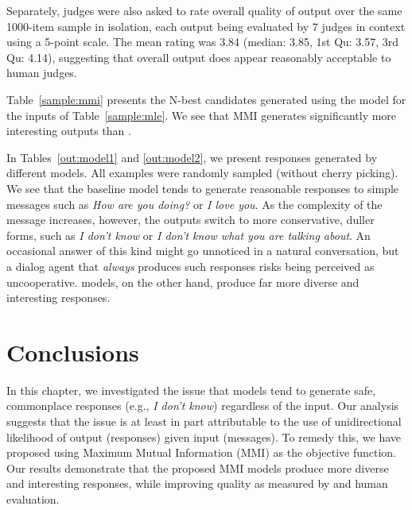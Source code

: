  
Separately, judges were also asked to rate overall quality of \mmiBD output over the same 1000-item sample in isolation, each output being evaluated by 7 judges in context using a 5-point scale. The mean rating was 3.84 (median: 3.85, 1st Qu: 3.57, 3rd Qu: 4.14), suggesting that overall \mmiBD output does appear reasonably acceptable to human judges.

Table~\ref{sample:mmi} presents the N-best candidates generated using the \mmiBD model for the inputs of Table~\ref{sample:mle}. We see that MMI generates significantly more interesting outputs than \sts. 
 
In Tables~\ref{out:model1} and \ref{out:model2}, we present responses generated by different models.
All examples were randomly sampled (without cherry picking).
We see that the baseline \sts model tends to generate reasonable responses to simple messages such as 
\textit{How are you doing?} or \textit{I love you}. 
As the complexity of the message increases, however, the outputs switch to more conservative, duller forms, such as 
\textit{I don't know} or \textit{I don't know what you are talking about}.
An occasional answer of this kind might go unnoticed in a natural conversation, but a dialog agent that \textit{always} produces such responses risks being perceived as uncooperative. 
\mmiBD models, on the other hand, produce far more diverse and interesting responses.
\section{Conclusions}
In this chapter, 
we investigated the issue
that \sts models 
 tend to generate safe, commonplace responses (e.g., \textit{I don't know}) regardless of the input. 
Our analysis suggests that the issue is at least in part attributable to the use of 
unidirectional likelihood of output (responses) given input (messages).
To remedy this, we have proposed using Maximum Mutual Information (MMI) as the objective function.
Our results demonstrate that the proposed MMI models produce more diverse and interesting responses, while improving quality as measured by \bleu and human evaluation. 
 



 
